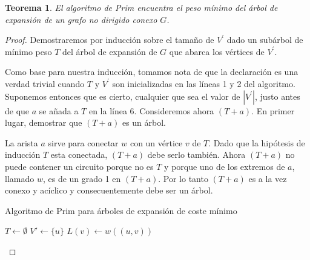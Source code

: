 \documentclass[10pt,a5paper]{book}
\newtheorem{teorema}{Teorema}[chapter]
\begin{document}
\begin{teorema}
El algoritmo de Prim encuentra el peso mínimo del árbol de expansión de un grafo no dirigido conexo $G$.
\end{teorema}
\begin{proof}
Demostraremos por inducción sobre el tamaño de $V^{'}$ dado un subárbol de mínimo peso $T$ del árbol de expansión de $G$ que abarca los vértices de $V^{'}$.

Como base para nuestra inducción, tomamos nota de que la declaración es una verdad trivial cuando $T$ y $V^{'}$ son inicializadas en las líneas 1 y 2 del algoritmo. Suponemos entonces que es cierto, cualquier que sea el valor de $|V^{'}|$, justo antes de que $a$ se añada a $T$ en la línea 6. Consideremos ahora $(T + a)$. En primer lugar, demostrar que $(T + a)$ es un árbol.

La arista $a$ sirve para conectar $w$ con un vértice $v$ de $T$. Dado que la hipótesis de inducción $T$ esta conectada, $(T + a)$ debe serlo también. Ahora $(T + a)$ no puede contener un circuito porque no es $T$ y porque uno de los extremos de $a$, llamado $w$, es de un grado 1 en $(T + a)$. Por lo tanto $(T + a)$ es a la vez conexo y acíclico y consecuentemente debe ser un árbol.

\begin{algorithm}[H]
\caption{Algoritmo de Prim para árboles de expansión de coste mínimo}
\BlankLine
\dontprintsemicolon
$T \leftarrow \emptyset$\;
$V' \leftarrow \{ u \}$\;
{
  $L(v) \leftarrow w((u,v))$\;
}
{
}

\end{algorithm}


\end{proof}
\end{document}
